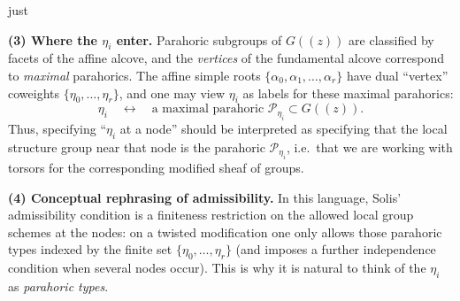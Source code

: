 just \documentclass[12pt]{article}
\begin{document}
\begin{remark}
\smallskip
\noindent\textbf{(3) Where the $\eta_i$ enter.}
Parahoric subgroups of $G((z))$ are classified by facets of the affine alcove,
and the \emph{vertices} of the fundamental alcove correspond to \emph{maximal}
parahorics.  The affine simple roots $\{\alpha_0,\alpha_1,\dots,\alpha_r\}$ have
dual ``vertex'' coweights $\{\eta_0,\dots,\eta_r\}$, and one may view $\eta_i$ as
labels for these maximal parahorics:
\[
\eta_i \quad\longleftrightarrow\quad \text{a maximal parahoric } \mathcal P_{\eta_i}\subset G((z)).
\]
Thus, specifying ``$\eta_i$ at a node'' should be interpreted as specifying that
the local structure group near that node is the parahoric $\mathcal P_{\eta_i}$,
i.e.\ that we are working with torsors for the corresponding modified sheaf of
groups.

\smallskip
\noindent\textbf{(4) Conceptual rephrasing of admissibility.}
In this language, Solis' admissibility condition is a finiteness restriction on
the allowed local group schemes at the nodes: on a twisted modification one only
allows those parahoric types indexed by the finite set
$\{\eta_0,\dots,\eta_r\}$ (and imposes a further independence condition when
several nodes occur).  This is why it is natural to think of the $\eta_i$ as
\emph{parahoric types}.
\end{remark}
\end{document}
